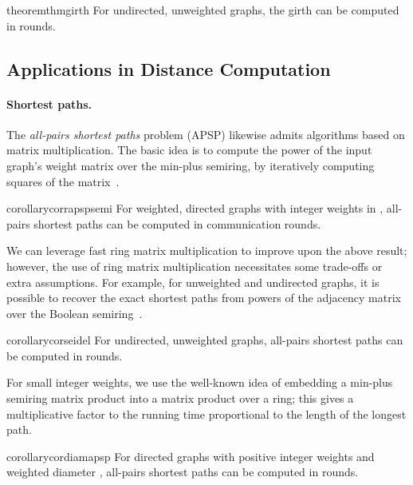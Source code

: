 \begin{restatable}{theorem}{thmgirth}
For undirected, unweighted graphs, the girth can be computed in  rounds.
\end{restatable}


\subsection{Applications in Distance Computation}

\paragraph{Shortest paths.}
The \emph{all-pairs shortest paths} problem (APSP) likewise admits algorithms based on matrix multiplication. The basic idea is to compute the  power of the input graph's weight matrix over the min-plus semiring, by iteratively computing squares of the matrix~\cite{furman1970application, Munro197156, fm1971boolean}. 

\begin{restatable}{corollary}{corrapspsemi}\label{thm:apsp-semiring}
For weighted, directed graphs with integer weights in , all-pairs shortest paths can be computed in  communication rounds.
\end{restatable}

We can leverage fast ring matrix multiplication to improve upon the above result; however, the use of ring matrix multiplication necessitates some trade-offs or extra assumptions. For example, for unweighted and undirected graphs, it is possible to recover the exact shortest paths from powers of the adjacency matrix over the Boolean semiring~\cite{Seidel1995400}.

\begin{restatable}{corollary}{corseidel}
For undirected, unweighted graphs, all-pairs shortest paths can be computed in  rounds.
\end{restatable}

For small integer weights, we use the well-known idea of embedding a min-plus semiring matrix product into a matrix product over a ring; this gives a multiplicative factor to the running time proportional to the length of the longest path.

\begin{restatable}{corollary}{cordiamapsp}
For directed graphs with positive integer weights and weighted diameter , all-pairs shortest paths can be computed in  rounds.
\end{restatable}

